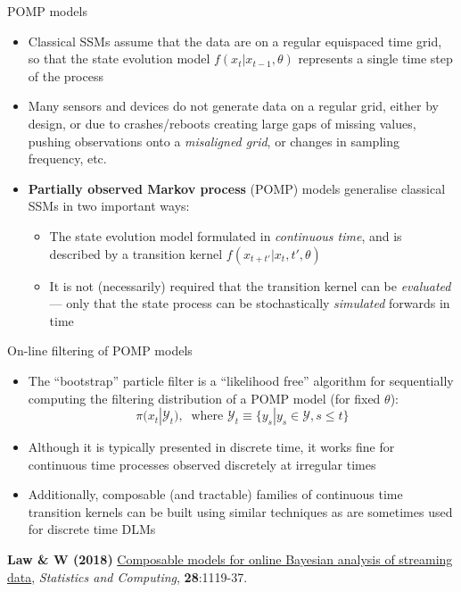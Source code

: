 \begin{frame}{POMP models}
\protect\hypertarget{pomp-models}{}

\begin{itemize}
\tightlist
\item
  Classical SSMs assume that the data are on a regular equispaced time
  grid, so that the state evolution model \(f(x_t|x_{t-1},\theta)\)
  represents a single time step of the process
\item
  Many sensors and devices do not generate data on a regular grid,
  either by design, or due to crashes/reboots creating large gaps of
  missing values, pushing observations onto a \emph{misaligned grid}, or
  changes in sampling frequency, etc.
\item
  \textbf{Partially observed Markov process} (POMP) models generalise
  classical SSMs in two important ways:

  \begin{itemize}
  \tightlist
  \item
    The state evolution model formulated in \emph{continuous time}, and
    is described by a transition kernel \(f(x_{t+t'}|x_t,t',\theta)\)
  \item
    It is not (necessarily) required that the transition kernel can be
    \emph{evaluated} --- only that the state process can be
    stochastically \emph{simulated} forwards in time
  \end{itemize}
\end{itemize}

\end{frame}

\begin{frame}{On-line filtering of POMP models}
\protect\hypertarget{on-line-filtering-of-pomp-models}{}

\begin{itemize}
\tightlist
\item
  The ``bootstrap'' particle filter is a ``likelihood free'' algorithm
  for sequentially computing the filtering distribution of a POMP model
  (for fixed \(\theta\)): \[
  \pi(x_t|\mathcal{Y}_t),\ \text{ where } \mathcal{Y}_t \equiv \{y_s|y_s\in\mathcal{Y},s\leq t\}
  \]
\item
  Although it is typically presented in discrete time, it works fine for
  continuous time processes observed discretely at irregular times
\item
  Additionally, composable (and tractable) families of continuous time
  transition kernels can be built using similar techniques as are
  sometimes used for discrete time DLMs
\end{itemize}

\textbf{Law \& W (2018)}
\href{https://doi.org/10.1007/s11222-017-9783-1}{Composable models for
online Bayesian analysis of streaming data}, \emph{Statistics and
Computing}, \textbf{28}:1119-37.

\end{frame}

